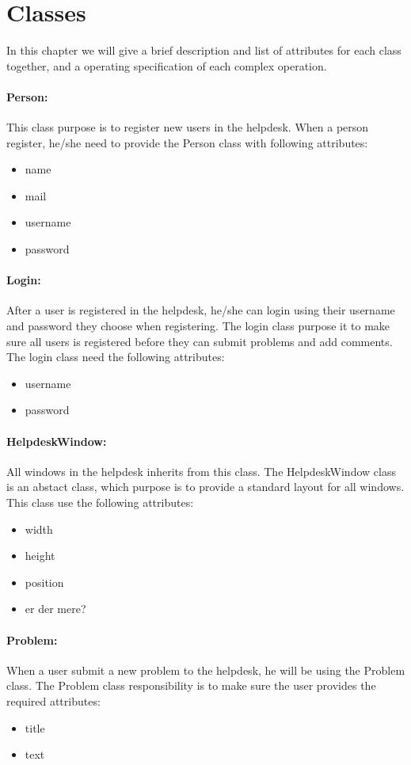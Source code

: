\section{Classes}
In this chapter we will give a brief description and list of attributes for each class together, and a operating specification of each complex operation.

 \paragraph{Person:}This class purpose is to register new users in the helpdesk. When a person register, he/she need to provide the Person class with following attributes:
\begin{itemize}
 \item{name}
 \item{mail}
 \item{username}
 \item{password}
\end{itemize}
 
 \paragraph{Login:}After a user is registered in the helpdesk, he/she can login using their username and password they choose when registering. The login class purpose it to make sure all users is registered before they can submit problems and add comments. The login class need the following attributes:
\begin{itemize}
 \item{username}
 \item{password}
\end{itemize}
 
 \paragraph{HelpdeskWindow:}All windows in the helpdesk inherits from this class. The HelpdeskWindow class is an abstact class, which purpose is to provide a standard layout for all windows. This class use the following attributes:
\begin{itemize}
 \item{width}
 \item{height}
 \item{position}
 \item{er der mere?}
\end{itemize}

 \paragraph{Problem:}When a user submit a new problem to the helpdesk, he will be using the Problem class. The Problem class responsibility is to make sure the user provides the required attributes:
 \begin{itemize}
 \item{title}
 \item{text}
\end{itemize}

